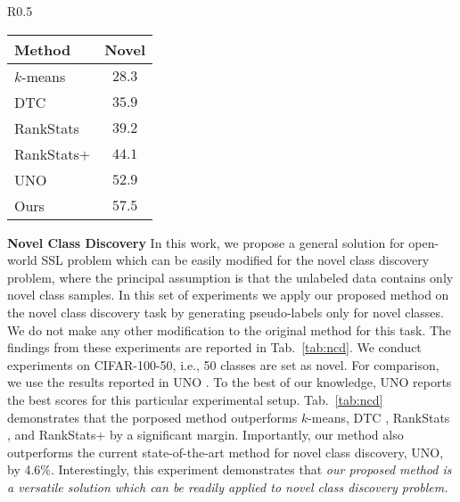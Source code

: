 \documentclass[runningheads]{eccv2022submission}
\begin{document}
  


\begin{wraptable}{R}{0.5\textwidth}
\vspace{-8mm}
\caption{Performance on novel class discovery task on \textbf{CIFAR-100} dataset with 50\% classes as seen and 50\% classes as novel.}
\vspace{-6mm}
\begin{center}
\small
\begin{tabular}{lc}
\hline

\textbf{Method}  & \textbf{Novel}\\

\hline
$k$-means & $28.3$\\
DTC\cite{han2019learning} & $35.9$\\
RankStats\cite{Han2020Automatically} & $39.2$\\
RankStats+\cite{Han2020Automatically} & $44.1$\\
UNO\cite{fini2021unified} & $52.9$\\
Ours & {\cellcolor{yellow!15}}${57.5}$\\\hline 

\end{tabular}
\end{center}
\label{tab:ncd}
\vspace{-8mm}
\end{wraptable}


\vspace{2mm}
\noindent \textbf{Novel Class Discovery}
In this work, we propose a general solution for open-world SSL problem which can be easily modified for the novel class discovery problem, where the principal assumption is that the unlabeled data contains only novel class samples. In this set of experiments we apply our proposed method on the novel class discovery task by generating pseudo-labels only for novel classes. We do not make any other modification to the original method for this task. The findings from these experiments are reported in Tab.~\ref{tab:ncd}. We conduct experiments on CIFAR-100-50, i.e., 50 classes are set as novel. For comparison, we use the results reported in UNO \cite{fini2021unified}. To the best of our knowledge, UNO reports the best scores for this particular experimental setup. Tab.~\ref{tab:ncd} demonstrates that the porposed method outperforms $k$-means, DTC \cite{han2019learning}, RankStats \cite{Han2020Automatically}, and RankStats+ by a significant margin. Importantly, our method also outperforms the current state-of-the-art method for novel class discovery, UNO, by 4.6\%. Interestingly, this experiment demonstrates that \emph{our proposed method is a versatile solution which can be readily applied to novel class discovery problem.}
\end{document}
